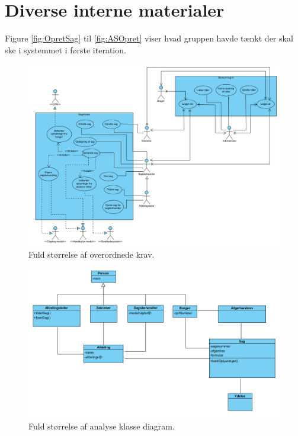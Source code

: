 \section{Diverse interne materialer} \label{sec:diverse}


Figure \ref{fig:OpretSag} til \ref{fig:ASOpret} viser hvad gruppen havde tænkt der skal ske i systemmet i første iteration. \\

\begin{figure}[hbt!]
  \includegraphics[width=\linewidth]{./PNG/krav/fuldoverkrav.PNG} 
  \caption{Fuld størrelse af overordnede krav.}
  \label{fig:fuldoverkrav}
\end{figure}

\begin{figure}[hbt!]
  \includegraphics[width=\linewidth]{./PNG/analyse/fuldanalyseklassediagram.PNG} 
  \caption{Fuld størrelse af analyse klasse diagram.}
  \label{fig:fuldDesignKlasseDiagram}
\end{figure}

